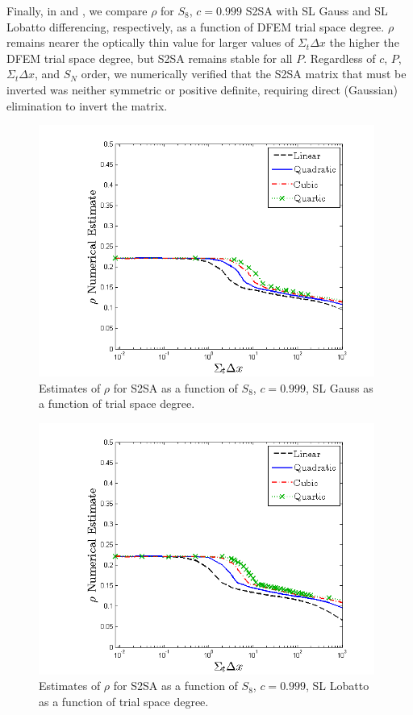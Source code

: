 Finally, in  and , we compare $\rho$ for $S_8$, $c=0.999$ S2SA with SL Gauss and SL Lobatto differencing, respectively, as a function of DFEM trial space degree.
$\rho$ remains nearer the optically thin value for larger values of $\Sigma_t \Delta x$ the higher the DFEM trial space degree, but S2SA remains stable for all $P$. 
Regardless of $c$, $P$, $\Sigma_t \Delta x$, and $S_N$ order, we numerically verified that the S2SA matrix that must be inverted was neither symmetric or positive definite, requiring direct (Gaussian) elimination to invert the matrix.
%
%
\begin{figure}[!hbp]
\centering
\includegraphics[width=11cm]{chapter4_acceleration/Constant_XS_SN8_S2SA_Gauss.png}
\caption{Estimates of $\rho$ for S2SA as a function of $S_8$, $c=0.999$, SL Gauss as a function of trial space degree.}
\label{fig:s2sa_gauss}
\end{figure}
%
%
\begin{figure}[!htp]
\centering
\includegraphics[width=11cm]{chapter4_acceleration/Constant_XS_SN8_S2SA_Lobatto.png}
\caption{Estimates of $\rho$ for S2SA as a function of $S_8$, $c=0.999$, SL Lobatto as a function of trial space degree.}
\label{fig:s2sa_lobatto}
\end{figure}

